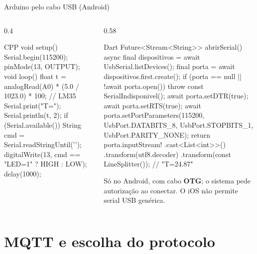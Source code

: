 \documentclass[aspectratio=169,10pt]{beamer}
\begin{document}
\begin{frame}[fragile]{Arduino pelo cabo USB (Android)}
  \begin{columns}[T]
    \begin{column}{0.4\textwidth}
\begin{codigo}[title=sensor\_serial.ino]{CPP}
void setup() {
  Serial.begin(115200);
  pinMode(13, OUTPUT);
}
void loop() {
  float t = analogRead(A0)
      * (5.0 / 1023.0) * 100;  // LM35
  Serial.print("T=");
  Serial.println(t, 2);
  if (Serial.available()) {
    String cmd =
        Serial.readStringUntil('\n');
    digitalWrite(13,
        cmd == "LED=1" ? HIGH : LOW);
  }
  delay(1000);
}
\end{codigo}
    \end{column}
    \begin{column}{0.58\textwidth}
\begin{codigo}[title=Lendo linhas com usb\_serial]{Dart}
Future<Stream<String>> abrirSerial() async {
  final dispositivos = await UsbSerial.listDevices();
  final porta = await dispositivos.first.create();
  if (porta == null || !await porta.open()) {
    throw const SerialIndisponivel();
  }
  await porta.setDTR(true);
  await porta.setRTS(true);
  await porta.setPortParameters(115200, UsbPort.DATABITS_8,
      UsbPort.STOPBITS_1, UsbPort.PARITY_NONE);
  return porta.inputStream!
      .cast<List<int>>()
      .transform(utf8.decoder)
      .transform(const LineSplitter());      // "T=24.87"
}
\end{codigo}
      \begin{atencao}
        Só no Android, com cabo \textbf{OTG}; o sistema pede autorização ao conectar. O iOS não permite serial USB genérica.
      \end{atencao}
    \end{column}
  \end{columns}
\end{frame}

\section{MQTT e escolha do protocolo}
\end{document}
